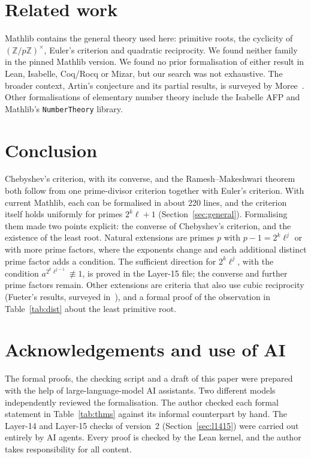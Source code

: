 \documentclass[11pt]{article}
\theoremstyle{remark}
\begin{document}
\section{Related work}

Mathlib contains the general theory used here: primitive roots, the cyclicity of
$(\mathbb{Z}/p\mathbb{Z})^\times$, Euler's criterion and quadratic reciprocity. We found neither family in the pinned Mathlib version. We found no prior formalisation of either
result in Lean, Isabelle, Coq/Rocq or Mizar, but our search was not exhaustive. The broader
context, Artin's conjecture and its partial results, is surveyed by Moree~\cite{Moree}. Other
formalisations of elementary number theory include the Isabelle AFP and Mathlib's
\texttt{NumberTheory} library.

\section{Conclusion}

Chebyshev's criterion, with its converse, and the Ramesh--Makeshwari theorem both follow from one
prime-divisor criterion together with Euler's criterion. With current Mathlib, each can be
formalised in about 220 lines, and the criterion itself holds uniformly for primes $2^k\ell+1$ (Section~\ref{sec:general}). Formalising them made two points explicit: the converse of Chebyshev's criterion, and the
existence of the least root. Natural extensions are primes $p$ with $p-1=2^k\ell^j$ or with more prime factors, where the
exponents change and each additional distinct prime factor adds a condition. The sufficient direction
for $2^k\ell^j$, with the condition $a^{2^k\ell^{j-1}}\not\equiv1$, is proved in the Layer-15 file;
the converse and further prime factors remain. Other extensions are criteria that also use cubic reciprocity (Fueter's
results, surveyed in~\cite[\S9.7, item~33]{Moree}), and a formal proof of the observation in Table~\ref{tab:dist} about the least primitive root.

\section*{Acknowledgements and use of AI}
The formal proofs, the checking script and a draft of this paper were prepared with the help of
large-language-model AI assistants. Two different models independently reviewed the
formalisation. The author checked each formal statement in Table~\ref{tab:thms} against its
informal counterpart by hand. The Layer-14 and Layer-15 checks of version~2
(Section~\ref{sec:l1415}) were carried out entirely by AI agents. Every proof is checked by the Lean kernel, and the author takes responsibility
for all content.
\end{document}
